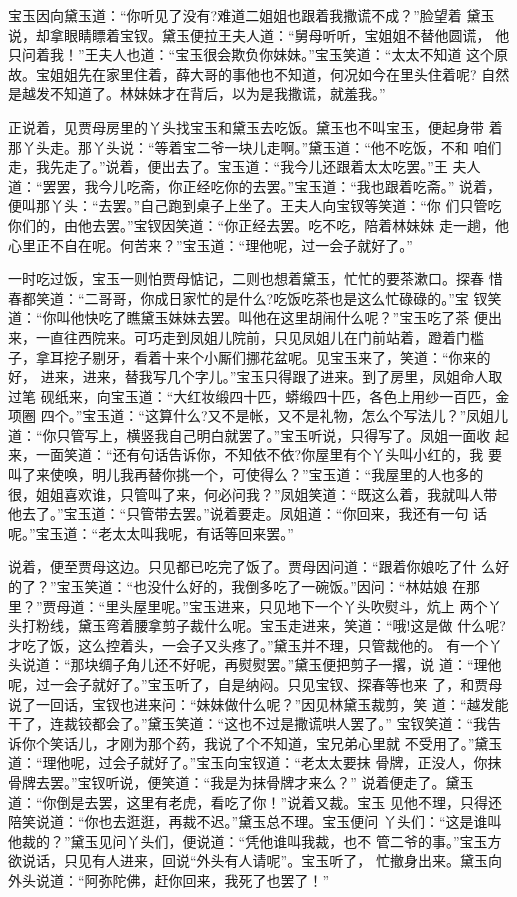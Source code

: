 宝玉因向黛玉道：“你听见了没有?难道二姐姐也跟着我撒谎不成？”脸望着
黛玉说，却拿眼睛瞟着宝钗。黛玉便拉王夫人道：“舅母听听，宝姐姐不替他圆谎，
他只问着我！”王夫人也道：“宝玉很会欺负你妹妹。”宝玉笑道：“太太不知道
这个原故。宝姐姐先在家里住着，薛大哥的事他也不知道，何况如今在里头住着呢?
自然是越发不知道了。林妹妹才在背后，以为是我撒谎，就羞我。”

正说着，见贾母房里的丫头找宝玉和黛玉去吃饭。黛玉也不叫宝玉，便起身带
着那丫头走。那丫头说：“等着宝二爷一块儿走啊。”黛玉道：“他不吃饭，不和
咱们走，我先走了。”说着，便出去了。宝玉道：“我今儿还跟着太太吃罢。”王
夫人道：“罢罢，我今儿吃斋，你正经吃你的去罢。”宝玉道：“我也跟着吃斋。”
说着，便叫那丫头：“去罢。”自己跑到桌子上坐了。王夫人向宝钗等笑道：“你
们只管吃你们的，由他去罢。”宝钗因笑道：“你正经去罢。吃不吃，陪着林妹妹
走一趟，他心里正不自在呢。何苦来？”宝玉道：“理他呢，过一会子就好了。”

一时吃过饭，宝玉一则怕贾母惦记，二则也想着黛玉，忙忙的要茶漱口。探春
惜春都笑道：“二哥哥，你成日家忙的是什么?吃饭吃茶也是这么忙碌碌的。”宝
钗笑道：“你叫他快吃了瞧黛玉妹妹去罢。叫他在这里胡闹什么呢？”宝玉吃了茶
便出来，一直往西院来。可巧走到凤姐儿院前，只见凤姐儿在门前站着，蹬着门槛
子，拿耳挖子剔牙，看着十来个小厮们挪花盆呢。见宝玉来了，笑道：“你来的好，
进来，进来，替我写几个字儿。”宝玉只得跟了进来。到了房里，凤姐命人取过笔
砚纸来，向宝玉道：“大红妆缎四十匹，蟒缎四十匹，各色上用纱一百匹，金项圈
四个。”宝玉道：“这算什么?又不是帐，又不是礼物，怎么个写法儿？”凤姐儿
道：“你只管写上，横竖我自己明白就罢了。”宝玉听说，只得写了。凤姐一面收
起来，一面笑道：“还有句话告诉你，不知依不依?你屋里有个丫头叫小红的，我
要叫了来使唤，明儿我再替你挑一个，可使得么？”宝玉道：“我屋里的人也多的
很，姐姐喜欢谁，只管叫了来，何必问我？”凤姐笑道：“既这么着，我就叫人带
他去了。”宝玉道：“只管带去罢。”说着要走。凤姐道：“你回来，我还有一句
话呢。”宝玉道：“老太太叫我呢，有话等回来罢。”

说着，便至贾母这边。只见都已吃完了饭了。贾母因问道：“跟着你娘吃了什
么好的了？”宝玉笑道：“也没什么好的，我倒多吃了一碗饭。”因问：“林姑娘
在那里？”贾母道：“里头屋里呢。”宝玉进来，只见地下一个丫头吹熨斗，炕上
两个丫头打粉线，黛玉弯着腰拿剪子裁什么呢。宝玉走进来，笑道：“哦!这是做
什么呢?才吃了饭，这么控着头，一会子又头疼了。”黛玉并不理，只管裁他的。
有一个丫头说道：“那块绸子角儿还不好呢，再熨熨罢。”黛玉便把剪子一撂，说
道：“理他呢，过一会子就好了。”宝玉听了，自是纳闷。只见宝钗、探春等也来
了，和贾母说了一回话，宝钗也进来问：“妹妹做什么呢？”因见林黛玉裁剪，笑
道：“越发能干了，连裁铰都会了。”黛玉笑道：“这也不过是撒谎哄人罢了。”
宝钗笑道：“我告诉你个笑话儿，才刚为那个药，我说了个不知道，宝兄弟心里就
不受用了。”黛玉道：“理他呢，过会子就好了。”宝玉向宝钗道：“老太太要抹
骨牌，正没人，你抹骨牌去罢。”宝钗听说，便笑道：“我是为抹骨牌才来么？”
说着便走了。黛玉道：“你倒是去罢，这里有老虎，看吃了你！”说着又裁。宝玉
见他不理，只得还陪笑说道：“你也去逛逛，再裁不迟。”黛玉总不理。宝玉便问
丫头们：“这是谁叫他裁的？”黛玉见问丫头们，便说道：“凭他谁叫我裁，也不
管二爷的事。”宝玉方欲说话，只见有人进来，回说“外头有人请呢”。宝玉听了，
忙撤身出来。黛玉向外头说道：“阿弥陀佛，赶你回来，我死了也罢了！”

